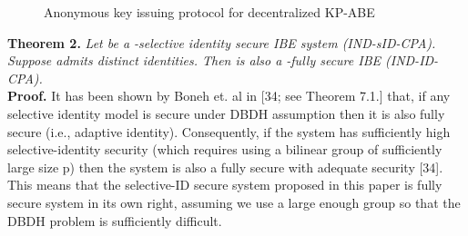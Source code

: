 \documentclass[10pt,journal]{IEEEtran}
\begin{document}
\begin{figure*}
\setlength{\unitlength}{0.14in} 
\caption{Anonymous key issuing protocol for decentralized KP-ABE}
\label{Anonymous key issuing protocol}
\end{figure*}



\noindent \textbf{Theorem 2.} \emph{Let  be a -selective identity secure IBE system (IND-sID-CPA). Suppose 
admits  distinct identities. Then  is also a -fully secure IBE (IND-ID-CPA).}\\

\noindent \textbf{Proof.} It has been shown by Boneh et. al in [34; see Theorem 7.1.] that, if any selective identity model is secure under DBDH assumption then it is also fully secure (i.e., adaptive identity). Consequently, if the system has sufficiently high selective-identity security (which requires using a bilinear group of sufficiently large size p) then the system is also a fully secure with adequate security [34]. This means that the selective-ID secure system proposed in this paper is fully secure system in its own right, assuming we use a large enough group so that the DBDH problem is sufficiently difficult.
\end{document}
